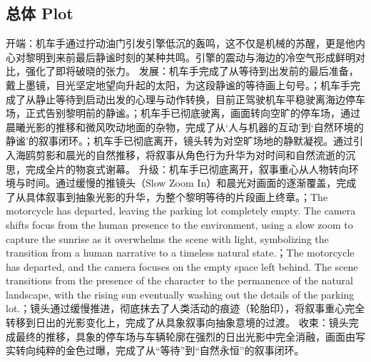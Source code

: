 \documentclass[11pt,a4paper]{article}
\begin{document}
\subsection*{总体 Plot}
开端：机车手通过拧动油门引发引擎低沉的轰鸣，这不仅是机械的苏醒，更是他内心对黎明到来前最后静谧时刻的某种共鸣。引擎的震动与海边的冷空气形成鲜明对比，强化了即将破晓的张力。 发展：机车手完成了从等待到出发前的最后准备，戴上墨镜，目光坚定地望向升起的太阳，为这段静谧的等待画上句号。；机车手完成了从静止等待到启动出发的心理与动作转换，目前正驾驶机车平稳驶离海边停车场，正式告别黎明前的静谧。；机车手已彻底驶离，画面转向空旷的停车场，通过晨曦光影的推移和微风吹动地面的杂物，完成了从‘人与机器的互动’到‘自然环境的静谧’的叙事闭环。；机车手已彻底离开，镜头转为对空旷场地的静默凝视。通过引入海鸥剪影和晨光的自然推移，将叙事从角色行为升华为对时间和自然流逝的沉思，完成全片的物哀式谢幕。 升级：机车手已彻底离开，叙事重心从人物转向环境与时间。通过缓慢的推镜头（Slow Zoom In）和晨光对画面的逐渐覆盖，完成了从具体叙事到抽象光影的升华，为整个黎明等待的片段画上终章。；The motorcycle has departed, leaving the parking lot completely empty. The camera shifts focus from the human presence to the environment, using a slow zoom to capture the sunrise as it overwhelms the scene with light, symbolizing the transition from a human narrative to a timeless natural state.；The motorcycle has departed, and the camera focuses on the empty space left behind. The scene transitions from the presence of the character to the permanence of the natural landscape, with the rising sun eventually washing out the details of the parking lot.；镜头通过缓慢推进，彻底抹去了人类活动的痕迹（轮胎印），将叙事重心完全转移到日出的光影变化上，完成了从具象叙事向抽象意境的过渡。 收束：镜头完成最终的推移，具象的停车场与车辆轮廓在强烈的日出光影中完全消融，画面由写实转向纯粹的金色过曝，完成了从“等待”到“自然永恒”的叙事闭环。
\end{document}
